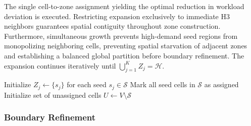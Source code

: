 \documentclass{article}
\begin{document}
The single cell-to-zone assignment yielding the optimal reduction in workload deviation is executed. Restricting expansion exclusively to immediate H3 neighbors guarantees spatial contiguity throughout zone construction. Furthermore, simultaneous growth prevents high-demand seed regions from monopolizing neighboring cells, preventing spatial starvation of adjacent zones and establishing a balanced global partition before boundary refinement. The expansion continues iteratively until $\bigcup_{j=1}^{K} Z_j = \mathcal{H}$.

\begin{algorithm}[H]


\BlankLine
Initialize $Z_j \leftarrow \{s_j\}$ for each seed $s_j \in \mathcal{S}$\;
Mark all seed cells in $\mathcal{S}$ as assigned\;
Initialize set of unassigned cells $U \leftarrow V \setminus \mathcal{S}$\;


\;
\caption{AHSI Simultaneous Region Growing}
\label{alg:ahsi_simultaneous_region_growing}
\end{algorithm}

\subsubsection{Boundary Refinement}
\label{subsubsec:ahsi_boundary_refinement}
\end{document}
